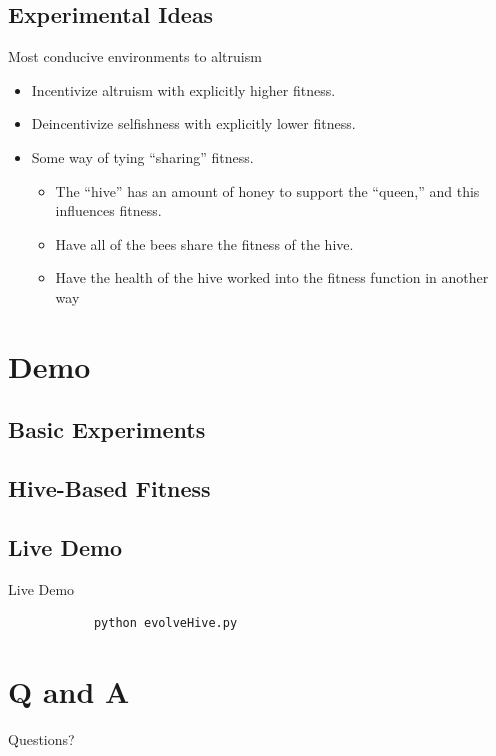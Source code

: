 \documentclass{beamer}
\begin{document}
	\subsection{Experimental Ideas}
	\begin{frame}{Most conducive environments to altruism}
		\begin{itemize}
			\item Incentivize altruism with explicitly higher fitness.
			\item Deincentivize selfishness with explicitly lower fitness.

			\item Some way of tying ``sharing'' fitness.
			\begin{itemize}
				\item The ``hive'' has an amount of honey to support the ``queen,'' and this influences fitness.
				\item Have all of the bees share the fitness of the hive.
				\item Have the health of the hive worked into the fitness function in another way
			\end{itemize}
		\end{itemize}
	\end{frame}


	\section{Demo}

	\subsection{Basic Experiments}

	\begin{frame}
        
		
	\end{frame}

	\subsection{Hive-Based Fitness}

	\begin{frame}
		
	\end{frame}


	\subsection{Live Demo}
	\begin{frame}[fragile]{Live Demo}
		\begin{verbatim}
			python evolveHive.py
		\end{verbatim}
	\end{frame}

	\section{Q and A}
	\begin{frame}{Questions?}
		\titlepage
	\end{frame}
\end{document}
